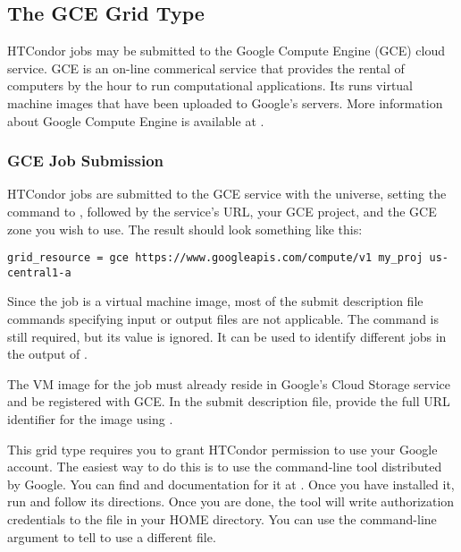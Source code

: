 \subsection{\label{sec:Gce}The GCE Grid Type }

HTCondor jobs may be submitted to the Google Compute Engine (GCE)
cloud service.
GCE is an on-line commerical service that provides
the rental of computers by the hour to run computational applications.
Its runs virtual machine images that have been uploaded to Google's
servers.
More information about Google Compute Engine is available at
.

\subsubsection{\label{sec:Gce-submit}GCE Job Submission}

HTCondor jobs are submitted to the GCE service
with the  universe, setting the
 command to , followed 
by the service's URL, your GCE project, and the GCE zone you 
wish to use.
The result should look something like this:
\begin{verbatim}
grid_resource = gce https://www.googleapis.com/compute/v1 my_proj us-central1-a
\end{verbatim}

Since the job is a virtual machine image,
most of the submit description file commands
specifying input or output files are not applicable.
The  command is still required,
but its value is ignored. 
It can be used to identify different jobs in the output of .

The VM image for the job must already reside in Google's Cloud Storage
service and be registered with GCE.
In the submit description file,
provide the full URL identifier for the image using .

This grid type requires you to grant HTCondor permission to use your
Google account. The easiest way to do this is to use the 
command-line tool distributed by Google.
You can find  and documentation for it at
.
Once you have installed it, run  and follow its
directions.
Once you are done, the tool will write authorization credentials to the
file  in your HOME directory.
You can use the  command-line argument to tell
 to use a different file.

